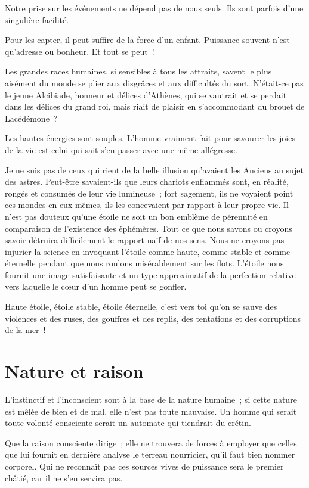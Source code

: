 \documentclass[french,twoside]{book} %
\newcommand{\astermono}{\medskip\centerline{\color{rubric}\large\selectfont{\syms ✻}}\medskip\par}%
\begin{document}
\astermono

\noindent Notre prise sur les événements ne dépend pas de nous seuls. Ils sont parfois d’une singulière facilité.\par
Pour les capter, il peut suffire de la force d’un enfant. Puissance souvent n’est qu’adresse ou bonheur. Et tout se peut !\par

\astermono

\noindent Les grandes races humaines, si sensibles à tous les attraits, savent le plus aisément du monde se plier aux disgrâces et aux difficultés du sort. N’était-ce pas le jeune Alcibiade, honneur et délices d’Athènes, qui se vautrait et se perdait dans les délices du grand roi, mais riait de plaisir en s’accommodant du brouet de Lacédémone ?\par
Les hautes énergies sont souples. L’homme vraiment fait pour savourer les joies de la vie est celui qui sait s’en passer avec une même allégresse.\par

\astermono

\noindent Je ne suis pas de ceux qui rient de la belle illusion qu’avaient les Anciens au sujet des astres. Peut-être savaient-ils que leurs chariots enflammés sont, en réalité, rongés et consumés de leur vie lumineuse ; fort sagement, ils ne voyaient point ces mondes en eux-mêmes, ils les concevaient par rapport à leur propre vie. Il n’est pas douteux qu’une étoile ne soit un bon emblème de pérennité en comparaison de l’existence des éphémères. Tout ce que nous savons ou croyons savoir détruira difficilement le rapport naïf de nos sens. Nous ne croyons pas injurier la science en invoquant l’étoile comme haute, comme stable et comme éternelle pendant que nous roulons misérablement sur les flots. L’étoile nous fournit une image satisfaisante et un type approximatif de la perfection relative vers laquelle le cœur d’un homme peut se gonfler.\par
Haute étoile, étoile stable, étoile éternelle, c’est vers toi qu’on se sauve des violences et des ruses, des gouffres et des replis, des tentations et des corruptions de la mer !
\section[Nature et raison]{Nature et raison}
\noindent L’instinctif et l’inconscient sont à la base de la nature humaine ; si cette nature est mêlée de bien et de mal, elle n’est pas toute mauvaise. Un homme qui serait toute volonté consciente serait un automate qui tiendrait du crétin.\par
Que la raison consciente dirige ; elle ne trouvera de forces à employer que celles que lui fournit en dernière analyse le terreau nourricier, qu’il faut bien nommer corporel. Qui ne reconnaît pas ces sources vives de puissance sera le premier châtié, car il ne s’en servira pas.\par
\end{document}
